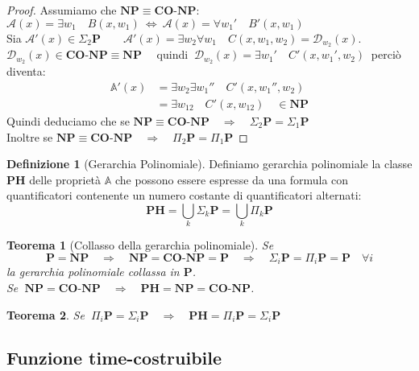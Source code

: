 \documentclass[a4paper]{article}
\newtheorem{thm}{Teorema}[subsection]
\theoremstyle{definition}
\newtheorem{definit}{Definizione}[subsection]
\newcommand{\p}{\mathbf{P}}
\newcommand{\np}{\mathbf{NP}}
\newcommand{\conp}{\mathbf{CO}\text{-}\mathbf{NP}}
\newcommand{\ph}{\mathbf{PH}}
\newcommand{\prob}[1]{\mathbb{#1}}
\newcommand{\alg}[1]{\mathcal{#1}}
\begin{document}
		\begin{proof}
			Assumiamo che $ \np \equiv \conp $: \\
			$ \alg{A}(x) = \exists w_1 \quad B(x, w_1) \ \Leftrightarrow \ \alg{A}(x) = \forall w_1' \quad B'(x,w_1) $ \\
			Sia $ \alg{A}'(x) \in \Sigma_2 \p \qquad \alg{A}'(x) = \exists w_2 \forall w_1 \quad C(x, w_1, w_2) = \alg{D}_{w_2}(x) $. \\
			$ \alg{D}_{w_2}(x) \in \conp \equiv \np \quad $ quindi $ \ \alg{D}_{w_2}(x) = \exists w_1'\quad C'(x, w_1', w_2) \ $ perciò diventa:
			\begin{align*}
				\prob{A}'(x) &= \exists w_2 \exists w_1'' \quad C'(x, w_1'', w_2) \\
							 &= \exists w_{1 2} \quad C'(x, w_{1 2}) \quad \in \np
			\end{align*}
			Quindi deduciamo che se $ \np \equiv \conp \quad \Rightarrow \quad \Sigma_2 \p = \Sigma_1 \p $\\
			Inoltre se $ \np \equiv \conp \quad \Rightarrow \quad \Pi_2 \p = \Pi_1 \p $
		\end{proof}
		
		\begin{definit}[Gerarchia Polinomiale]
			Definiamo gerarchia polinomiale la classe $ \ph $ delle proprietà $ \prob{A} $ che possono essere espresse da una formula con quantificatori contenente un numero costante di quantificatori alternati:
			\[
				\ph = \bigcup_k \Sigma_k \p = \bigcup_k \Pi_k \p
			\]
		\end{definit}
		
		\begin{thm}[Collasso della gerarchia polinomiale]
			Se 
			\[
				\p = \np \quad \Rightarrow \quad \np = \conp = \p \quad \Rightarrow \quad \Sigma_i \p = \Pi_i \p = \p \quad \forall i
			\]
			la gerarchia polinomiale collassa in $ \p $.\\
			Se $ \ \np = \conp \quad \Rightarrow \quad \ph = \np = \conp $.
		\end{thm}
		
		\begin{thm}
			Se $ \ \Pi_i \p = \Sigma_i \p \quad \Rightarrow \quad \ph = \Pi_i \p = \Sigma_i \p $
		\end{thm}
		
	\subsection{Funzione time-costruibile}
	
\end{document}
